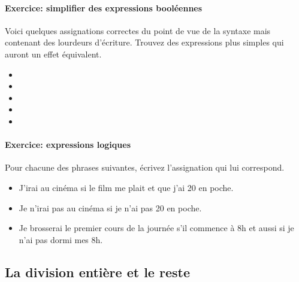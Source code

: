				
				\begin{Emphase}
				\paragraph{Exercice: simplifier des expressions booléennes}

				Voici quelques assignations correctes du point de vue de la
				syntaxe mais contenant des lourdeurs d’écriture.  Trouvez des
				expressions plus simples qui auront un effet équivalent.
				
				\begin{itemize}
					\item {}
					\item {}
					\item {}
					\item {}
					\item {}
				\end{itemize}		
			\end{Emphase}
		
			\begin{Emphase}
				\paragraph{Exercice: expressions logiques}
				Pour chacune des phrases suivantes,
				écrivez l’assignation qui lui correspond.
				\begin{itemize}
				\item J’irai au cinéma si le film me plait et que 
					j’ai 20\texteuro{} en poche.
				\item Je n’irai pas au cinéma si je n’ai pas 
					20\texteuro{} en poche.
				\item Je brosserai le premier cours de la journée 
					s’il commence à 8h et aussi si je n’ai pas dormi mes 8h.
				\end{itemize}
			\end{Emphase}
			
		\subsection{La division entière et le reste}
		
